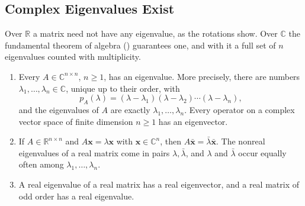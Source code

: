 \subsection{Complex Eigenvalues Exist}

Over $\mathbb R$ a matrix need not have any eigenvalue, as the rotations show. Over $\mathbb C$ the fundamental theorem of algebra () guarantees one, and with it a full set of $n$ eigenvalues counted with multiplicity.

\begin{theorem}
\label{thm:eigenvalues-exist}
\leavevmode
\begin{enumerate}
\item Every $A\in\mathbb C^{n\times n}$, $n\ge1$, has an eigenvalue. More precisely, there are numbers $\lambda_1,\ldots,\lambda_n\in\mathbb C$, unique up to their order, with
\[
p_A(\lambda)=(\lambda-\lambda_1)(\lambda-\lambda_2)\cdots(\lambda-\lambda_n),
\]
and the eigenvalues of $A$ are exactly $\lambda_1,\ldots,\lambda_n$. Every operator on a complex vector space of finite dimension $n\ge1$ has an eigenvector.
\item If $A\in\mathbb R^{n\times n}$ and $A\mathbf x=\lambda\mathbf x$ with $\mathbf x\in\mathbb C^n$, then $A\bar{\mathbf x}=\bar\lambda\bar{\mathbf x}$. The nonreal eigenvalues of a real matrix come in pairs $\lambda,\bar\lambda$, and $\lambda$ and $\bar\lambda$ occur equally often among $\lambda_1,\ldots,\lambda_n$.
\item A real eigenvalue of a real matrix has a real eigenvector, and a real matrix of odd order has a real eigenvalue.
\end{enumerate}
\end{theorem}

